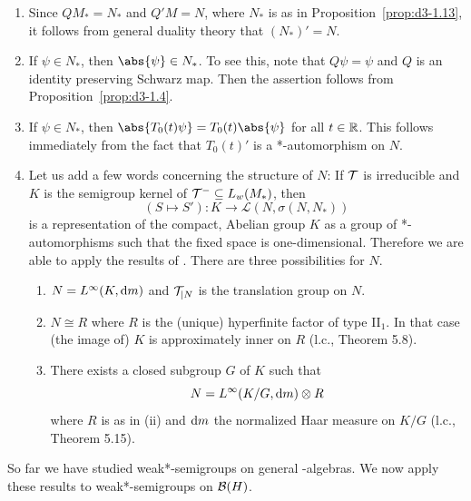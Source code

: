 \begin{remarks}\label{rem:d4-3.6}
\begin{enumerate}[\upshape (i), wide, labelindent=.25em]
\item
Since $QM_{*} = N_{*}$ and $Q'M = N$, where $N_{*}$ is as in Proposition~\ref{prop:d3-1.13}, it follows from general duality theory that $(N_{*})' = N$.

\item
If\/ $\psi \in N_{*}$, then $\abs{\psi} \in N_{*}$.
To see this, note that $Q\psi = \psi$ and $Q$ is an identity preserving Schwarz map.
Then the assertion follows from Proposition~\ref{prop:d3-1.4}.

\item
If\/ $\psi \in N_{*}$, then $\abs{T_{0}(t)\psi} = T_{0}(t)\abs{\psi}$ for all $t \in \mathbb{R}$.
This follows immediately from the fact that $T_{0}(t)'$ is a *-automorphism on $N$.

\item
Let us add a few words concerning the structure of\/ $N$: If\/ $\mathcal{T}$ is irreducible and $K$ is the semigroup kernel of\/ $\mathcal{T}^{-} \subseteq L_{w}(M_{*})$, then 
%
\[
	(S \mapsto S') \colon K \to \mathcal{L}(N,\sigma(N,N_{*})) 
\]
%
is a representation of the compact, Abelian group $K$ as a group of *-automorphisms such that the fixed space is one-dimensional.
Therefore we are able to apply the results of \textcite{olesen:1980}.
There are three possibilities for $N$.
\begin{enumerate}[\upshape(a), wide, labelindent=.25em]
\item
$N = L^{\infty}(K,\mathop{}\!\mathrm{d}{m})$ and $\mathcal{T}_{\vert N}$ is the translation group on $N$.

\item
$N \cong R$ where $R$ is the (unique) hyperfinite factor of type II$_{1}$.
In that case (the image of) $K$ is approximately inner on $R$ (l.c., Theorem 5.8).

\item
There exists a closed subgroup $ G $  of\/ $ K $  such that
\[
N = L^{\infty}(K/G, \mathop{}\!\mathrm{d}{m}) \otimes R
\]
where $ R $  is as in (ii) and $ \mathop{}\!\mathrm{d}{m} $  the normalized Haar measure on $ K/G $  (l.c., Theorem 5.15).
\end{enumerate}
\end{enumerate}
\end{remarks}
So far we have studied weak*-semigroups on general \WA-algebras.
We now apply these results to weak*-semigroups on $ \mathcal{B}(H) $.
